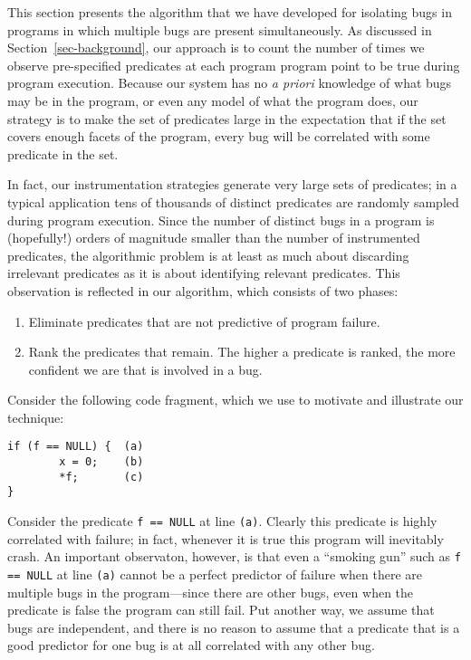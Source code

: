 
This section presents the algorithm that we have developed for
isolating bugs in programs in which multiple bugs are present
simultaneously.  As discussed in Section~\ref{sec-background}, our
approach is to count the number of times we observe pre-specified
predicates at each program program point to be true during program
execution.  Because our system has no {\em a priori} knowledge of what bugs
may be in the program, or even any model of what the program does, our
strategy is to make the set of predicates large in the expectation that
if the set covers enough facets of the program, every bug will be correlated
with some predicate in the set.

In fact, our instrumentation strategies generate very large sets
of predicates; in a typical application tens of thousands of distinct
predicates are randomly sampled during program execution.  Since the
number of distinct bugs in a program is (hopefully!) orders of
magnitude smaller than the number of instrumented predicates, the
algorithmic problem is at least as much about discarding irrelevant
predicates as it is about identifying relevant predicates.  This
observation is reflected in our algorithm, which consists of two phases:
\begin{enumerate}
\item Eliminate predicates that are not predictive of program failure.

\item Rank the predicates that remain.  The higher a predicate is ranked,
the more confident we are that is involved in a bug.
\end{enumerate}

Consider the following code fragment, which we use to motivate and illustrate
our technique:
\begin{verbatim}
if (f == NULL) {  (a)
        x = 0;    (b)
        *f;       (c)
}
\end{verbatim}
Consider the predicate {\tt f == NULL} at line {\tt (a)}.  Clearly
this predicate is highly correlated with failure; in fact, whenever it
is true this program will inevitably crash.  An important observaton,
however, is that even a ``smoking gun'' such as {\tt f == NULL} at
line {\tt (a)} cannot be a perfect predictor of failure when there are
multiple bugs in the program---since there are other bugs, even when
the predicate is false the program can still fail.  Put another way, we assume
that bugs are independent, and there is no reason to assume that
a predicate that is a good predictor for one bug is at all correlated
with any other bug.

